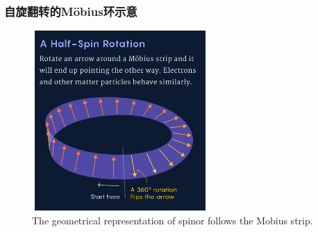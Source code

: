 \frame
{
	\frametitle{自旋翻转的\textrm{M\"obius}环示意}
	\begin{figure}[h!]
\centering
\vspace*{-0.10in}
\includegraphics[height=2.7in,width=2.65in,viewport=0 0 1120 1170,clip]{Figures/spin_half_mobius_2.jpg}
\caption{\tiny \textrm{The geometrical representation of spinor follows the Mobius strip.}}%
\label{Fig:Mobius}
\end{figure}
}

